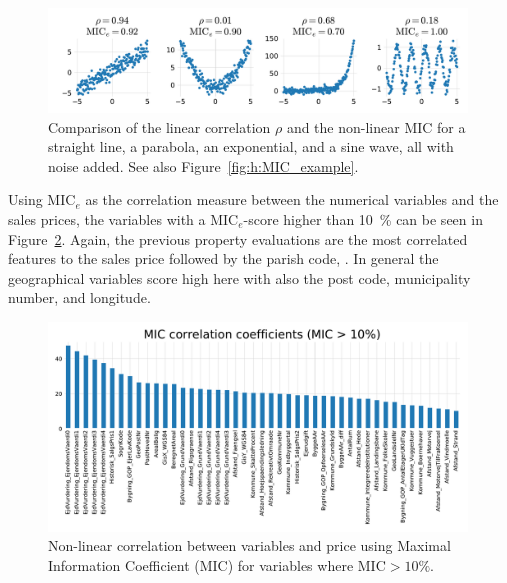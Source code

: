 \begin{figure}
  \centerfloat
  \includegraphics[width=0.99\textwidth, trim=10 10 10 10, clip]{figures/housing/MIC_test_small.pdf}
  \caption[Comparison of the Linear Correlation $\rho$ and the Non-Linear MIC.]
          {Comparison of the linear correlation $\rho$ and the non-linear MIC for a straight line, a parabola, an exponential, and a sine wave, all with noise added. See also Figure~\ref{fig:h:MIC_example}.}
  \label{fig:h:MIC_example_small}
\end{figure}

Using $\mathrm{MIC}_e$ as the correlation measure between the numerical variables and the sales prices, the variables with a $\mathrm{MIC}_e$-score higher than \SI{10}{\percent} can be seen in Figure~\ref{fig:h:corr_MIC}. Again, the previous property evaluations are the most correlated features to the sales price followed by the parish code, . In general the geographical variables score high here with also the post code, municipality number, and longitude. 

\begin{figure}
  \centerfloat
  \includegraphics[width=0.99\textwidth, trim=10 10 0 40, clip]{figures/housing/MIC_plot.pdf}
  \caption[Non-linear correlation Between Variables and Price]
          {Non-linear correlation between variables and price using Maximal Information Coefficient (MIC) for variables where $\text{MIC}>10\%$.}
  \label{fig:h:corr_MIC}
\end{figure}


